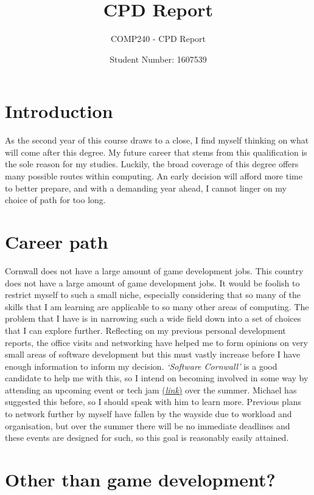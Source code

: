 \documentclass{scrartcl}
\title{CPD Report}
\subtitle{COMP240 - CPD Report}
\author{Student Number: 1607539}
\begin{document}
\maketitle

\section*{Introduction}

As the second year of this course draws to a close, I find myself thinking on what will come after this degree. My future career that stems from this qualification is the sole reason for my studies. Luckily, the broad coverage of this degree offers many possible routes within computing. An early decision will afford more time to better prepare, and with a demanding year ahead, I cannot linger on my choice of path for too long.
 
\section*{Career path}

Cornwall does not have a large amount of game development jobs. This country does not have a large amount of game development jobs. It would be foolish to restrict myself to such a small niche, especially considering that so many of the skills that I am learning are applicable to so many other areas of computing. The problem that I have is in narrowing such a wide field down into a set of choices that I can explore further. Reflecting on my previous personal development reports, the office visits and networking have helped me to form opinions on very small areas of software development but this must vastly increase before I have enough information to inform my decision. \textit{`Software Cornwall'} is a good candidate to help me with this, so I intend on becoming involved in some way by attending an upcoming event or tech jam \href{https://www.softwarecornwall.org/events/}{(\textit{link})} over the summer. Michael has suggested this before, so I should speak with him to learn more. Previous plans to network further by myself have fallen by the wayside due to workload and organisation, but over the summer there will be no immediate deadlines and these events are designed for such, so this goal is reasonably easily attained.

\section*{Other than game development?}
\end{document}
